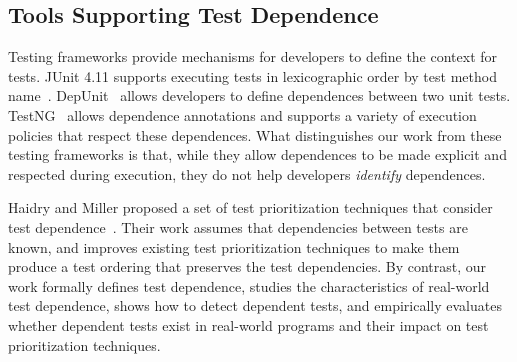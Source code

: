 

\subsection{Tools Supporting Test Dependence}
\label{sec:supporting}


Testing frameworks provide mechanisms
for developers to define the context for tests.
JUnit 4.11 supports
executing tests in lexicographic order by test method name~\cite{junitordering}.
%
DepUnit~\cite{depunit} allows developers to define
dependences between two unit tests.
TestNG~\cite{testng} 
allows dependence annotations and supports a variety of execution policies
that respect these dependences.
What distinguishes our work from these testing frameworks is that, while they allow dependences
to be made explicit and respected during execution, they do not help developers
\emph{identify} dependences.  

Haidry and Miller proposed a set of
test prioritization techniques that consider
test dependence~\cite{10.1109/TSE.2012.26}.  
Their work assumes that dependencies between tests are
known, and improves existing test prioritization techniques
to make them produce a test ordering that preserves the test dependencies.
By contrast, our work formally defines test dependence,
studies the characteristics of real-world test dependence,
shows how to detect dependent tests,
and empirically evaluates whether dependent tests exist in real-world
programs and
their impact on test prioritization techniques.


